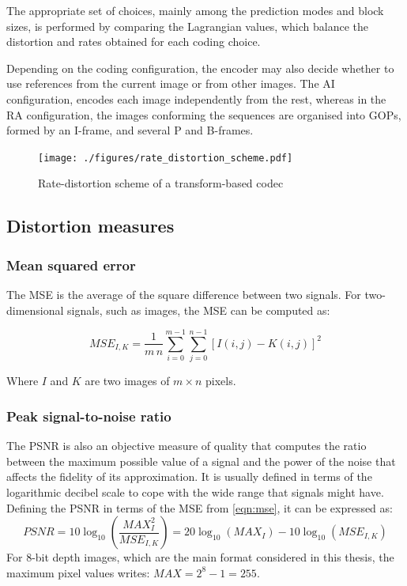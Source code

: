 \documentclass[11pt,a4paper,openright,twoside]{book}
\numberwithin{equation}{section} %
\numberwithin{figure}{section} %
\numberwithin{table}{section} %
\begin{document}
The appropriate set of choices, mainly among the prediction modes and block
sizes, is performed by comparing the Lagrangian values, which balance the
distortion and rates obtained for each coding choice.

Depending on the coding configuration, the encoder may also decide whether to
use references from the current image or from other images.
The \ac{AI} configuration, encodes each image independently from the rest,
whereas in the \ac{RA} configuration, the images conforming the sequences are
organised into \acp{GOP}, formed by an I-frame, and several P and B-frames.

\begin{figure}[tb]
	\centering
	\texttt{[image: ./figures/rate\_distortion\_scheme.pdf]}
	\caption{Rate-distortion scheme of a transform-based codec}
	\label{fig:rate_distortion_scheme}
\end{figure}

\subsection{Distortion measures}
\label{sub:distortion_measures}

\subsubsection{Mean squared error}
\label{ssub:mean_squared_error}

The \ac{MSE} is the average of the square difference between two
signals.
For two-dimensional signals, such as images, the \ac{MSE} can be computed as:

\begin{equation}
	MSE_{I,K} = \frac{1}{m\,n} \sum\limits_{i=0}^{m-1} \sum\limits_{j=0}^{n-1}
	{\left[ I(i,j) - K(i,j) \right]} ^2
	\label{eqn:mse}
\end{equation}

Where $I$ and $K$ are two images of $m \times n$ pixels.

\subsubsection{Peak signal-to-noise ratio}
\label{ssub:peak_signal_to_noise_ratio}

The \ac{PSNR} is also an objective measure of quality that computes the ratio
between the maximum possible value of a signal and the power of the noise that
affects the fidelity of its approximation.
It is usually defined in terms of the logarithmic decibel scale to cope
with the wide range that signals might have.
Defining the \ac{PSNR} in terms of the \ac{MSE} from
\eqref{eqn:mse}, it can be expressed as:
\begin{equation}
	PSNR = 10 \log_{10} \left(\frac{MAX_I^2}{MSE_{I,K}}\right)
	= 20 \log_{10} (MAX_I) - 10 \log_{10} (MSE_{I,K})
	\label{eqn:psnr}
\end{equation}
For 8-bit depth images, which are the main format considered in this thesis,
the maximum pixel values writes: $MAX = 2^{8} - 1 = 255$.
\end{document}
